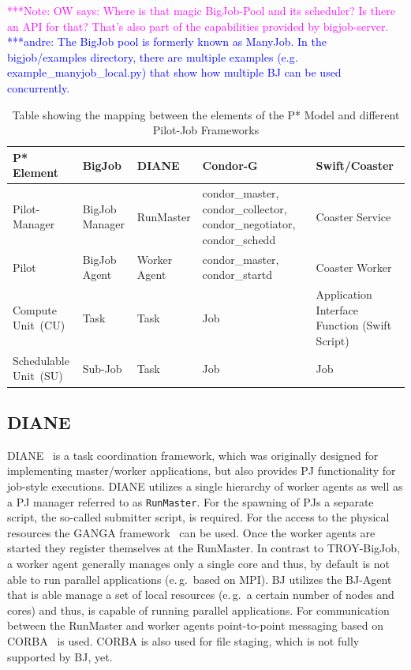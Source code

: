\documentclass[conference,final]{IEEEtran}
\newcommand{\alnote}[1]{ {\textcolor{blue} { ***andre: #1 }}}
\newcommand{\note}[1]{ {\textcolor{magenta} { ***Note: #1 }}}
\newcommand{\alnote}[1]{}
\newcommand{\note}[1]{}
\newcommand{\pilot}{Pilot\xspace}
\newcommand{\computeunit}{Compute Unit\xspace}
\newcommand{\su}{Schedulable Unit\xspace}
\newcommand{\upp}{\vspace*{-0.5em}}
\begin{document}
\note{OW says: Where is that magic BigJob-Pool and its scheduler? Is there an
API for that? That's also part of the capabilities provided by
bigjob-server.}\alnote{The BigJob pool is formerly known as ManyJob. In the
bigjob/examples directory, there are multiple examples (e.g.
example\_manyjob\_local.py) that show how multiple BJ can be used concurrently.}

% 
\upp

\begin{table}[t]
\centering
\begin{tabular}{|p{2.5cm}|p{3cm}|p{3cm}|p{3cm}|p{3cm}|}
  \hline
  \textbf{P* Element} &\textbf{BigJob} &\textbf{DIANE} &\textbf{Condor-G} &\textbf{Swift/Coaster}  \\
  \hline
  Pilot-Manager &BigJob Manager & RunMaster & condor\_master, condor\_collector, condor\_negotiator, condor\_schedd &Coaster Service\\ 
  \hline
  \pilot &BigJob Agent  & Worker Agent &condor\_master, condor\_startd &Coaster Worker\\
  \hline
  \computeunit  \ (CU) &Task &Task &Job &Application Interface Function (Swift Script)\\
  \hline
  \su \ (SU) &Sub-Job &Task &Job &Job\\
\hline
\end{tabular}
\caption{Table showing the mapping between the elements of the P* Model and different Pilot-Job Frameworks\upp\upp} \label{table:bigjob-saga-diane}
\end{table}

\upp
\subsection{DIANE\upp\upp}

DIANE~\cite{Moscicki:908910} is a task coordination framework, which
was originally designed for implementing master/worker applications,
but also provides PJ functionality for job-style executions. DIANE
utilizes a single hierarchy of worker agents as well as a PJ manager
referred to as \texttt{RunMaster}.
For the spawning of PJs a separate script, the so-called submitter script, is
required. For the access to the physical resources the GANGA
framework~\cite{Moscicki20092303} can be used.
Once the worker agents are started they register themselves at the RunMaster.
In contrast to TROY-BigJob, a worker agent generally manages only a single
core and thus, by default is not able to run parallel applications (e.\,g.\
based on MPI). BJ utilizes the BJ-Agent that is able manage a set of local
resources (e.\,g.\ a certain number of nodes and cores) and thus, is capable
of running parallel applications. For communication between the RunMaster and
worker agents point-to-point messaging based on CORBA~\cite{OMG-CORBA303:2004}
is used. CORBA is also used for file staging, which is not fully supported by
BJ, yet.
\end{document}
